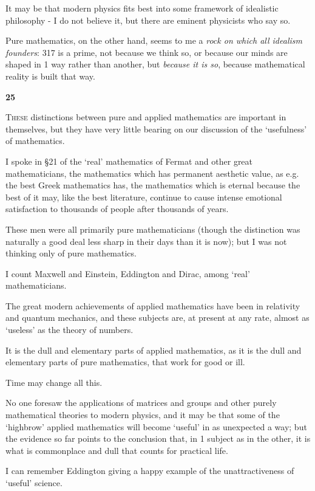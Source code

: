 \documentclass{article}
\numberwithin{equation}{section}
\begin{document}
It may be that modern physics fits best into some framework of idealistic philosophy - I do not believe it, but there are eminent physicists who say so.

Pure mathematics, on the other hand, seems to me a \textit{rock on which all idealism founders}: 317 is a prime, not because we think so, or because our minds are shaped in 1 way rather than another, but \textit{because it is so}, because mathematical reality is built that way.

\begin{center}
    \large\textbf{25}
\end{center}
\textsc{These} distinctions between pure and applied mathematics are important in themselves, but they have very little bearing on our discussion of the `usefulness' of mathematics.

I spoke in \S21 of the `real' mathematics of Fermat and other great mathematicians, the mathematics which has permanent aesthetic value, as e.g. the best Greek mathematics has, the mathematics which is eternal because the best of it may, like the best literature, continue to cause intense emotional satisfaction to thousands of people after thousands of years.

These men were all primarily pure mathematicians (though the distinction was naturally a good deal less sharp in their days than it is now); but I was not thinking only of pure mathematics.

I count Maxwell and Einstein, Eddington and Dirac, among `real' mathematicians.

The great modern achievements of applied mathematics have been in relativity and quantum mechanics, and these subjects are, at present at any rate, almost as `useless' as the theory of numbers.

It is the dull and elementary parts of applied mathematics, as it is the dull and elementary parts of pure mathematics, that work for good or ill.

Time may change all this.

No one foresaw the applications of matrices and groups and other purely mathematical theories to modern physics, and it may be that some of the `highbrow' applied mathematics will become `useful' in as unexpected a way; but the evidence so far points to the conclusion that, in 1 subject as in the other, it is what is commonplace and dull that counts for practical life.

%
I can remember Eddington giving a happy example of the unattractiveness of `useful' science.
\end{document}

